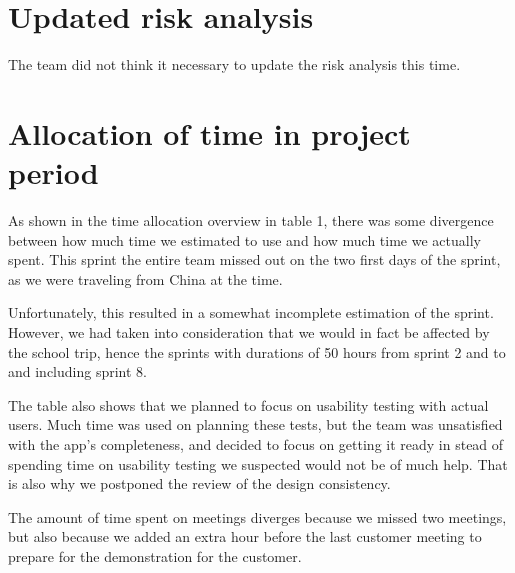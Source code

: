 \documentclass[12pt]{article}
\begin{document}
\section{Updated risk analysis}
The team did not think it necessary to update the risk analysis this time.


\section{Allocation of time in project period}
As shown in the time allocation overview in table 1, there was some divergence between how much time we estimated to use and how much time we actually spent. This sprint the entire team missed out on the two first days of the sprint, as we were traveling from China at the time. 

Unfortunately, this resulted in a somewhat incomplete estimation of the sprint. However, we had taken into consideration that we would in fact be affected by the school trip, hence the sprints with durations of 50 hours from sprint 2 and to and including sprint 8.

The table also shows that we planned to focus on usability testing with actual users. Much time was used on planning these tests, but the team was unsatisfied with the app's completeness, and decided to focus on getting it ready in stead of spending time on usability testing we suspected would not be of much help. That is also why we postponed the review of the design consistency.

The amount of time spent on meetings diverges because we missed two meetings, but also because we added an extra hour before the last customer meeting to prepare for the demonstration for the customer.
\end{document}
